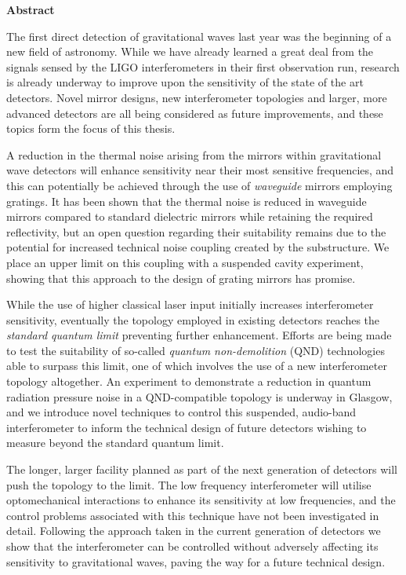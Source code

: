 \begin{preface}
\begin{center} {\bf Abstract}\end{center}

The first direct detection of gravitational waves last year was the beginning of a new field of astronomy. While we have already learned a great deal from the signals sensed by the LIGO interferometers in their first observation run, research is already underway to improve upon the sensitivity of the state of the art detectors. Novel mirror designs, new interferometer topologies and larger, more advanced detectors are all being considered as future improvements, and these topics form the focus of this thesis.

A reduction in the thermal noise arising from the mirrors within gravitational wave detectors will enhance sensitivity near their most sensitive frequencies, and this can potentially be achieved through the use of \emph{waveguide} mirrors employing gratings. It has been shown that the thermal noise is reduced in waveguide mirrors compared to standard dielectric mirrors while retaining the required reflectivity, but an open question regarding their suitability remains due to the potential for increased technical noise coupling created by the substructure. We place an upper limit on this coupling with a suspended cavity experiment, showing that this approach to the design of grating mirrors has promise.

While the use of higher classical laser input initially increases interferometer sensitivity, eventually the \MI{} topology employed in existing detectors reaches the \emph{standard quantum limit} preventing further enhancement. Efforts are being made to test the suitability of so-called \emph{quantum non-demolition} (QND) technologies able to surpass this limit, one of which involves the use of a new interferometer topology altogether. An experiment to demonstrate a reduction in quantum radiation pressure noise in a QND-compatible \SSM{} topology is underway in Glasgow, and we introduce novel techniques to control this suspended, audio-band interferometer to inform the technical design of future detectors wishing to measure beyond the standard quantum limit.

The longer, larger \ET{} facility planned as part of the next generation of detectors will push the \MI{} topology to the limit. The low frequency interferometer will utilise optomechanical interactions to enhance its sensitivity at low frequencies, and the control problems associated with this technique have not been investigated in detail. Following the approach taken in the current generation of detectors we show that the interferometer can be controlled without adversely affecting its sensitivity to gravitational waves, paving the way for a future technical design.
\end{preface}